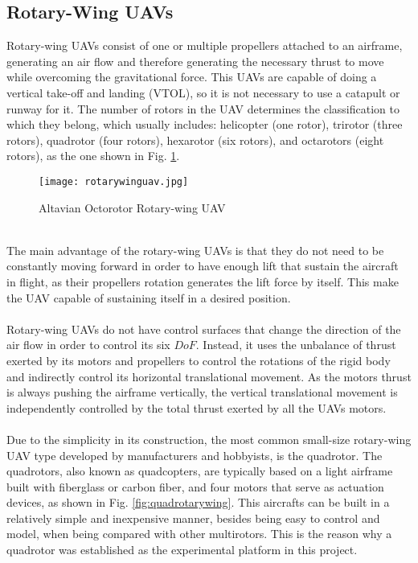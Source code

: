 \subsection{Rotary-Wing UAVs}
Rotary-wing UAVs consist of one or multiple propellers attached to an airframe, generating an air flow and therefore generating the necessary thrust to move while overcoming the gravitational force. This UAVs are capable of doing a vertical take-off and landing (VTOL), so it is not necessary to use a catapult or runway for it. The number of rotors in the UAV determines the classification to which they belong, which usually includes: helicopter (one rotor), trirotor (three rotors), quadrotor (four rotors), hexarotor (six rotors), and octarotors (eight rotors), as the one shown in Fig. \ref{fig:rotarywing}.
\begin{figure}[h]
\begin{center}
\texttt{[image: rotarywinguav.jpg]}    
\caption[Altavian Octorotor Rotary-wing UAV]{Altavian Octorotor Rotary-wing UAV\protect\footnotemark} 
\label{fig:rotarywing}
\end{center}
\end{figure}
\\The main advantage of the rotary-wing UAVs is that they do not need to be constantly moving forward in order to have enough lift that sustain the aircraft in flight, as their propellers rotation generates the lift force by itself. This make the UAV capable of sustaining itself in a desired position.
\\\\
Rotary-wing UAVs do not have control surfaces that change the direction of the air flow in order to control its six $DoF$. Instead, it uses the unbalance of thrust exerted by its motors and propellers to control the rotations of the rigid body and indirectly control its horizontal translational movement. As the motors thrust is always pushing the airframe vertically, the vertical translational movement is independently controlled by the total thrust exerted by all the UAVs motors.
\\\\
Due to the simplicity in its construction, the most common small-size rotary-wing UAV type developed by manufacturers and hobbyists, is the quadrotor. The quadrotors, also known as quadcopters, are typically based on a light airframe built with fiberglass or carbon fiber, and four motors that serve as actuation devices, as shown in Fig. \ref{fig:quadrotarywing}. This aircrafts  can be built in a relatively simple and inexpensive manner, besides being easy to control and model, when being compared with other multirotors. This is the reason why a quadrotor was established as the experimental platform in this project.
